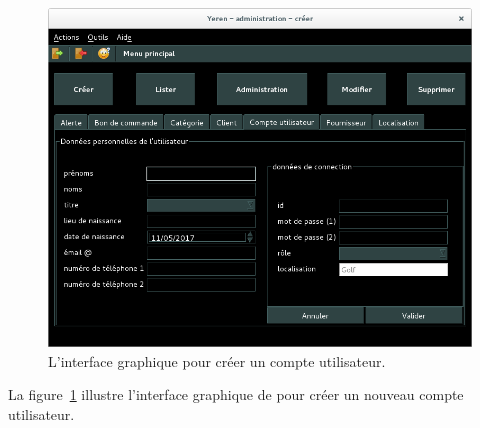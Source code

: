 
\newpage
{}

\begin{figure}[!htpb]
	\centering
	\includegraphics[scale=0.45]{images/compte-utilisateur-creer.png}
	\caption{L'interface graphique pour cr\'eer un compte utilisateur.}
	\label{fig:admin-comptes-utilisateurs-creer}
\end{figure}

La figure~\ref{fig:admin-comptes-utilisateurs-creer} illustre
l'interface graphique de \yeroth pour cr\'eer un nouveau
compte utilisateur.

